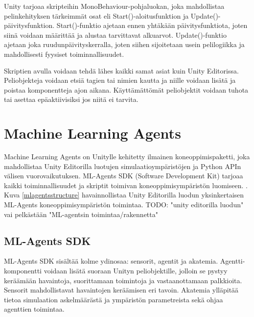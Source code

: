 \documentclass[utf8]{gradu3}
\begin{document}
Unity tarjoaa skripteihin MonoBehaviour-pohjaluokan, joka mahdollistaa pelinkehityksen tärkeimmät osat eli Start()-aloitusfunktion ja Update()-päivitysfunktion. Start()-funktio ajetaan ennen yhtäkään päivitysfunktiota, joten siinä voidaan määrittää ja alustaa tarvittavat alkuarvot. Update()-funktio ajetaan joka ruudunpäivityskerralla, joten siihen sijoitetaan usein pelilogiikka ja mahdollisesti fyysiset toiminnallisuudet.

Skriptien avulla voidaan tehdä lähes kaikki samat asiat kuin Unity Editorissa. Peliobjekteja voidaan etsiä tagien tai nimien kautta ja niille voidaan lisätä ja poistaa komponentteja ajon aikana. Käyttämättömät peliobjektit voidaan tuhota tai asettaa epäaktiivisiksi jos niitä ei tarvita.

\section{Machine Learning Agents}

Machine Learning Agents on Unitylle kehitetty ilmainen koneoppimispaketti, joka mahdollistaa Unity Editorilla luotujen simulaatioympäristöjen ja Python APIn välisen vuorovaikutuksen. ML-Agents SDK (Software Development Kit) tarjoaa kaikki toiminnallisuudet ja skriptit toimivan koneoppimisympäristön luomiseen. \parencite{juliani2018unity}. Kuva \ref{mlagentsstructure} havainnollistaa Unity Editorilla luodun yksinkertaisen ML-Agents koneoppimisympäristön toimintaa. TODO: "unity editorilla luodun" vai pelkästään "ML-agentsin toimintaa/rakennetta"

\subsection{ML-Agents SDK}

ML-Agents SDK sisältää kolme ydinosaa: sensorit, agentit ja akatemia. Agentti-komponentti voidaan lisätä suoraan Unityn peliobjektille, jolloin se pystyy keräämään havaintoja, suorittamaan toimintoja ja vastaanottamaan palkkioita. Sensorit mahdollistavat havaintojen keräämisen eri tavoin. Akatemia ylläpitää tietoa simulaation askelmäärästä ja ympäristön parametreista sekä ohjaa agenttien toimintaa.
\end{document}
